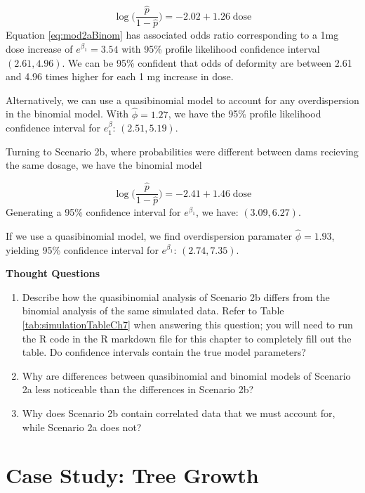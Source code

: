 \documentclass[
]{krantz}
\begin{document}
\begin{equation}
  \log\bigg( \frac{\hat{p}}{1-\hat{p}} \bigg) = -2.02 + 1.26\;\textrm{dose}
  \label{eq:mod2aBinom}
\end{equation}
Equation \eqref{eq:mod2aBinom} has associated odds ratio corresponding to a 1mg dose increase of \(e^{\beta_1} = 3.54\) with 95\% profile likelihood confidence interval \((2.61, 4.96)\). We can be 95\% confident that odds of deformity are between 2.61 and 4.96 times higher for each 1 mg increase in dose.

Alternatively, we can use a quasibinomial model to account for any overdispersion in the binomial model. With \(\widehat{\phi} = 1.27\), we have the 95\% profile likelihood confidence interval for \(e^\beta_1\): \((2.51, 5.19)\).

Turning to Scenario 2b, where probabilities were different between dams recieving the same dosage, we have the binomial model

\begin{equation}
  \log\bigg( \frac{\hat{p}}{1-\hat{p}} \bigg) = -2.41 + 1.46\;\textrm{dose}
  \label{eq:mod2bBinom}
\end{equation}
Generating a 95\% confidence interval for \(e^{\beta_1}\), we have: \((3.09, 6.27)\).

If we use a quasibinomial model, we find overdispersion paramater \(\widehat{\phi} = 1.93\), yielding 95\% confidence interval for \(e^{\beta_1}\): \((2.74, 7.35)\).

\textbf{Thought Questions}

\begin{enumerate}
\def\labelenumi{\arabic{enumi}.}
\setcounter{enumi}{8}
\item
  Describe how the quasibinomial analysis of Scenario 2b differs from the binomial analysis of the same simulated data. Refer to Table \ref{tab:simulationTableCh7} when answering this question; you will need to run the R code in the R markdown file for this chapter to completely fill out the table. Do confidence intervals contain the true model parameters?
\item
  Why are differences between quasibinomial and binomial models of Scenario 2a less noticeable than the differences in Scenario 2b?
\item
  Why does Scenario 2b contain correlated data that we must account for, while Scenario 2a does not?
\end{enumerate}

\hypertarget{case-study-tree-growth}{%
\section{Case Study: Tree Growth}\label{case-study-tree-growth}}
\end{document}
